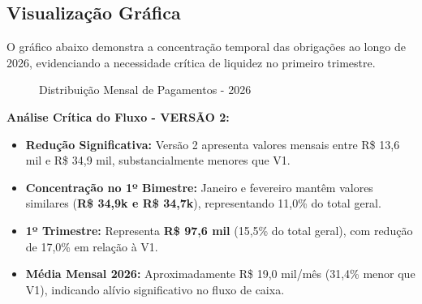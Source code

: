 \documentclass[12pt, a4paper]{article}
\begin{document}
\subsection{Visualização Gráfica}

O gráfico abaixo demonstra a concentração temporal das obrigações ao longo de 2026, evidenciando a necessidade crítica de liquidez no primeiro trimestre.

\begin{figure}[H]
    \centering
    \caption{Distribuição Mensal de Pagamentos - 2026}
\end{figure}

\vspace{0.5cm}

\textbf{Análise Crítica do Fluxo - VERSÃO 2:}
\begin{itemize}
    \item \textbf{Redução Significativa:} Versão 2 apresenta valores mensais entre R\$ 13,6 mil e R\$ 34,9 mil, substancialmente menores que V1.
    \item \textbf{Concentração no 1º Bimestre:} Janeiro e fevereiro mantêm valores similares (\textbf{R\$ 34,9k e R\$ 34,7k}), representando 11,0\% do total geral.
    \item \textbf{1º Trimestre:} Representa \textbf{R\$ 97,6 mil} (15,5\% do total geral), com redução de 17,0\% em relação à V1.
    \item \textbf{Média Mensal 2026:} Aproximadamente R\$ 19,0 mil/mês (31,4\% menor que V1), indicando alívio significativo no fluxo de caixa.
\end{itemize}
\end{document}
